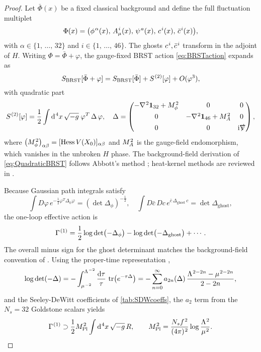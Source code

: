 \documentclass[pdflatex,sn-mathphys-num]{sn-jnl}
\theoremstyle{thmstyleone}
\theoremstyle{thmstyletwo}%
\theoremstyle{thmstylethree}%
\newcommand{\tr}{\operatorname{tr}}
\newcommand{\sm}{\hspace{.065em}}
\newcommand{\smexp}[1]{^{\sm #1}}
\newcommand{\dv}[1]{\mathrm{d}\smexp{#1}}
\begin{document}
\begin{proof}
Let \(\bar\Phi(x)\) be a fixed classical background and define the full
fluctuation multiplet
\[
  \Phi(x)=\bigl(\phi\smexp{\alpha}(x),\,
                A_{\mu}\smexp{i}(x),\,
                \psi\smexp{a}(x),\,
                c\smexp{i}(x),\,
                \bar c\smexp{i}(x)\bigr),
\]
with
\(
  \alpha\in \{1,\,\dots,\,32\}
\)
and
\(
  i\in\{1,\,\dots,\,46\}
\).
The ghosts \(c\smexp{i},\bar c\smexp{i}\) transform in the adjoint of
\(H\). Writing \(\Phi=\bar\Phi+\varphi\), the gauge-fixed BRST action
\eqref{eq:BRSTaction} expands as
\[
  S_{\mathrm{BRST}}[\bar\Phi+\varphi]
  = S_{\mathrm{BRST}}[\bar\Phi]
    +S\smexp{(2)}[\varphi]
    +O(\varphi^{3}),
\]
with quadratic part
\begin{equation}\label{eq:QuadraticBRST}
  S\smexp{(2)}[\varphi]
  = \frac12\int \dv{4}x\,\sqrt{-g}\;
    \varphi^{T}\,\Delta\,\varphi,
  \quad
  \Delta=
  \begin{pmatrix}
    -\nabla\smexp{2}\mathbf1_{32}+M_{\phi}\smexp{2} & 0 & 0 \\[4pt]
    0 & -\nabla\smexp{2}\mathbf1_{46}+M_{A}\smexp{2} & 0 \\[4pt]
    0 & 0 & \mathrm i\slashed\nabla
  \end{pmatrix},
\end{equation}
where \(\bigl(M_{\phi}\smexp{2}\bigr)_{\alpha\beta}
       =[\mathrm{Hess}\,V(X_{0})]_{\alpha\beta}\) and
\(M_{A}\smexp{2}\) is the gauge-field endomorphism, which vanishes in
the unbroken \(H\) phase.  The background-field derivation of
\eqref{eq:QuadraticBRST} follows Abbott's method \cite{Abbott:1981ke};
heat-kernel methods are reviewed in \cite{Vassilevich:2003xt}.

Because Gaussian path integrals satisfy \cite{Peskin:1995ev,Abbott:1981ke}
\[
  \int D\varphi\,e^{-\tfrac12\varphi^{T}\Delta_{\phi}\varphi}
  =(\det\Delta_{\phi})^{-\tfrac12},
  \quad
  \int D\bar c\,Dc\,e^{\bar c\,\Delta_{\text{ghost}}\,c}
  =\det\Delta_{\text{ghost}},
\]
the one-loop effective action is
\begin{equation}\label{eq:OneLoop}
  \Gamma\smexp{(1)}
  = \frac12\log\det\bigl(-\Delta_{\phi}\bigr)
    - \log\det\bigl(-\Delta_{\text{ghost}}\bigr)
    + \cdots.
\end{equation}
The overall minus sign for the ghost determinant matches the
background-field convention of \cite{Abbott:1981ke}.
Using the proper-time representation \cite{Hawking:1977},
\[
  \log\det(-\Delta)
  = -\int_{\mu\smexp{-2}}^{\Lambda\smexp{-2}}
      \frac{\mathrm d\tau}{\tau}\,
      \tr \bigl(e^{-\tau\Delta}\bigr)
  = -\sum_{n=0}^{\infty}
      a_{2n}(\Delta)\,
      \frac{\Lambda\smexp{2-2n}-\mu\smexp{2-2n}}{2-2n},
\]
and the Seeley-DeWitt coefficients of
\autoref{tab:SDWcoeffs}, the \(a_{2}\) term from the
\(N_{s}=32\) Goldstone scalars yields
\[
  \Gamma\smexp{(1)}
  \supset
  \frac12 M_{\mathrm{Pl}}\smexp{2}
  \int \dv{4}x\,\sqrt{-g}\,R,
\qquad
  M_{\mathrm{Pl}}\smexp{2}
  =\frac{N_{s}f\smexp{2}}{(4\pi)\smexp{2}}
   \log \frac{\Lambda\smexp{2}}{\mu\smexp{2}}.\qedhere
\]
\end{proof}
\end{document}
